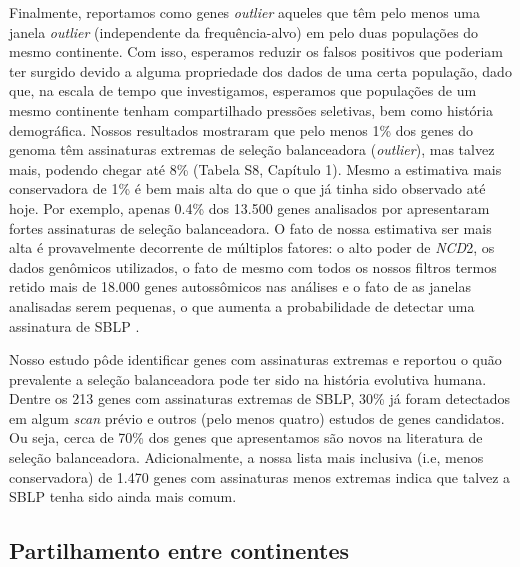 \begin{refsection}
Finalmente, reportamos como genes \emph{outlier} aqueles que têm pelo menos uma janela \emph{outlier} (independente da frequência-alvo) em pelo duas populações do mesmo continente. Com isso, esperamos reduzir os falsos positivos que poderiam ter surgido devido a alguma propriedade dos dados de uma certa população, dado que, na escala de tempo que investigamos, esperamos que populações de um mesmo continente tenham compartilhado pressões seletivas, bem como história demográfica. Nossos resultados mostraram que  pelo menos 1\% dos genes do genoma têm assinaturas extremas de seleção balanceadora (\emph{outlier}), mas talvez mais, podendo chegar até 8\% (Tabela S8, Capítulo 1). Mesmo a estimativa mais conservadora de 1\% é bem mais alta do que o que já tinha sido observado até hoje. Por exemplo, apenas  0.4\% dos 13.500 genes analisados por \textcite{Andres2009} apresentaram fortes assinaturas de seleção balanceadora. O fato de nossa estimativa ser mais alta é provavelmente decorrente de múltiplos fatores: o alto poder de \emph{NCD}2, os dados genômicos utilizados, o fato de mesmo com todos os nossos filtros termos retido mais de 18.000 genes autossômicos nas análises e o fato de as janelas analisadas serem pequenas, o que aumenta a probabilidade de detectar uma assinatura de SBLP \parencite{Andres2011,Charlesworth2009}. 


Nosso estudo pôde identificar genes com assinaturas extremas e  reportou o quão prevalente a seleção balanceadora pode ter sido na história evolutiva humana. Dentre os 213 genes com assinaturas extremas de SBLP,  30\% já foram detectados em algum \emph{scan} prévio e outros (pelo menos quatro) estudos de genes candidatos. Ou seja, cerca de 70\% dos genes que apresentamos são novos na literatura de seleção balanceadora. Adicionalmente, a nossa lista mais inclusiva (i.e, menos conservadora) de 1.470 genes com assinaturas menos extremas indica que talvez a SBLP tenha sido ainda mais comum. 

\subsection{Partilhamento entre continentes} %



\end{refsection}
